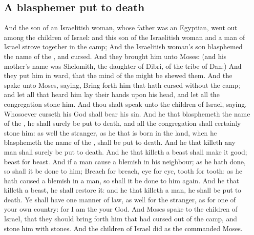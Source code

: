 \begin{biblechapter}
\section*{A blasphemer put to death}
\verse And the son of an Israelitish woman, whose father was an Egyptian, went out among the children of Israel: and this son of the Israelitish woman and a man of Israel strove together in the camp;
\verse And the Israelitish woman's son blasphemed the name of the \LORD, and cursed. And they brought him unto Moses: (and his mother's name was Shelomith, the daughter of Dibri, of the tribe of Dan:)
\verse And they put him in ward, that the mind of the \LORD might be shewed them.
\verse And the \LORD spake unto Moses, saying,
\verse Bring forth him that hath cursed without the camp; and let all that heard him lay their hands upon his head, and let all the congregation stone him.
\verse And thou shalt speak unto the children of Israel, saying, Whosoever curseth his God shall bear his sin.
\verse And he that blasphemeth the name of the \LORD, he shall surely be put to death, and all the congregation shall certainly stone him: as well the stranger, as he that is born in the land, when he blasphemeth the name of the \LORD, shall be put to death.
\verse And he that killeth any man shall surely be put to death.
\verse And he that killeth a beast shall make it good; beast for beast.
\verse And if a man cause a blemish in his neighbour; as he hath done, so shall it be done to him;
\verse Breach for breach, eye for eye, tooth for tooth: as he hath caused a blemish in a man, so shall it be done to him again.
\verse And he that killeth a beast, he shall restore it: and he that killeth a man, he shall be put to death.
\verse Ye shall have one manner of law, as well for the stranger, as for one of your own country: for I am the \LORD your God.
\verse And Moses spake to the children of Israel, that they should bring forth him that had cursed out of the camp, and stone him with stones. And the children of Israel did as the \LORD commanded Moses.
\end{biblechapter}

